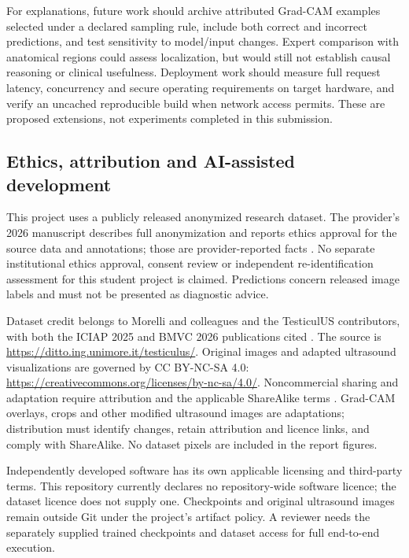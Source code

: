 \documentclass[11pt,a4paper]{article}
\begin{document}
For explanations, future work should archive attributed Grad-CAM examples selected under a declared sampling rule, include both correct and incorrect predictions, and test sensitivity to model/input changes. Expert comparison with anatomical regions could assess localization, but would still not establish causal reasoning or clinical usefulness. Deployment work should measure full request latency, concurrency and secure operating requirements on target hardware, and verify an uncached reproducible build when network access permits. These are proposed extensions, not experiments completed in this submission.

\subsection{Ethics, attribution and AI-assisted development}
This project uses a publicly released anonymized research dataset. The provider's 2026 manuscript describes full anonymization and reports ethics approval for the source data and annotations; those are provider-reported facts \citep{2026BMVC}. No separate institutional ethics approval, consent review or independent re-identification assessment for this student project is claimed. Predictions concern released image labels and must not be presented as diagnostic advice.

Dataset credit belongs to Morelli and colleagues and the TesticulUS contributors, with both the ICIAP 2025 and BMVC 2026 publications cited \citep{2025ICIAP,2026BMVC}. The source is \url{https://ditto.ing.unimore.it/testiculus/}. Original images and adapted ultrasound visualizations are governed by CC BY-NC-SA 4.0: \url{https://creativecommons.org/licenses/by-nc-sa/4.0/}. Noncommercial sharing and adaptation require attribution and the applicable ShareAlike terms \citep{cclicence}. Grad-CAM overlays, crops and other modified ultrasound images are adaptations; distribution must identify changes, retain attribution and licence links, and comply with ShareAlike. No dataset pixels are included in the report figures.

Independently developed software has its own applicable licensing and third-party terms. This repository currently declares no repository-wide software licence; the dataset licence does not supply one. Checkpoints and original ultrasound images remain outside Git under the project's artifact policy. A reviewer needs the separately supplied trained checkpoints and dataset access for full end-to-end execution.
\end{document}
